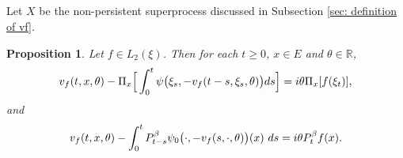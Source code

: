 \documentclass[12pt, a4paper]{amsart}
\newtheorem{prop}[thm]{Proposition}
\theoremstyle{definition}
\numberwithin{equation}{section}
\begin{document}
\subsection{}
    Let $X$ be the non-persistent superprocess discussed in Subsection \ref{sec: definition of vf}.
\begin{prop}
\label{prop: complex FKPP-equation}
	Let $f\in L_2(\xi)$. Then for each $t\geq 0$, $x\in E$ and $\theta \in \mathbb R$,
\begin{equation}
\label{eq: complex FKPP-equation}
	v_f(t,x,\theta) - \Pi_{x} \Big[\int_0^t \psi\big(\xi_s, - v_f(t-s,\xi_s,\theta)\big) ds \Big]
	\\= i\theta \Pi_{x} [f(\xi_t)],
\end{equation}
and
\begin{equation}
\label{eq: complex FKPP-equation with FK-transform}
    v_f(t,x,\theta) -  \int_0^t P_{t-s}^{\beta} \psi_0\big(\cdot,-v_f(s,\cdot,\theta)\big) (x)~ds
    \\= i\theta P_t^\beta f(x).
\end{equation}
\end{prop}
\end{document}
